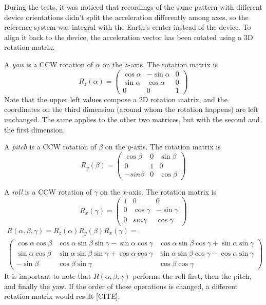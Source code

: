 During the tests, it was noticed that recordings of the same pattern with different device orientations didn't split the acceleration differently among axes, so the reference system was integral with the Earth's center instead of the device. To align it back to the device, the acceleration vector has been rotated using a 3D rotation matrix.
\bigbreak

A \textit{yaw} is a CCW rotation of $\alpha$ on the $z$-axis. The rotation matrix is
\[
	R_z(\alpha) =
	\begin{pmatrix}
		\cos\alpha & -\sin\alpha & 0 \\
		\sin\alpha & \cos\alpha & 0 \\
		0 & 0 & 1
	\end{pmatrix}
\]
Note that the upper left values compose a 2D rotation matrix, and the coordinates on the third dimension (around whom the rotation happens) are left unchanged. The same applies to the other two matrices, but with the second and the first dimension.
\bigbreak

A \textit{pitch} is a CCW rotation of $\beta$ on the $y$-axis. The rotation matrix is
\[
	R_y(\beta) =
	\begin{pmatrix}
		\cos\beta & 0 & \sin\beta \\
		0 & 1 & 0 \\
		-sin\beta & 0 & \cos\beta
	\end{pmatrix}
\]

A \textit{roll} is a CCW rotation of $\gamma$ on the $x$-axis. The rotation matrix is
\[
	R_x(\gamma) =
	\begin{pmatrix}
		1 & 0 & 0 \\
		0 & \cos\gamma & -\sin\gamma \\
		0 & sin\gamma & \cos\gamma
	\end{pmatrix}
\]
\begin{gather*}
	R(\alpha, \beta, \gamma) = R_z(\alpha) R_y(\beta) R_x(\gamma) = \\
	\begin{pmatrix}
		\cos\alpha \cos\beta & \cos\alpha \sin\beta \sin\gamma - \sin\alpha \cos\gamma & \cos\alpha \sin\beta \cos\gamma + \sin\alpha \sin\gamma \\
		\sin\alpha \cos\beta & \sin\alpha \sin\beta \sin\gamma + \cos\alpha \cos\gamma & \sin\alpha \sin\beta \cos\gamma - \cos\alpha \sin\gamma \\
		-\sin\beta & \cos\beta \sin\gamma & \cos\beta \cos\gamma
	\end{pmatrix}
\end{gather*}
It is important to note that $R(\alpha, \beta, \gamma)$ performs the roll first, then the pitch, and finally the yaw. If the order of these operations is changed, a different rotation matrix would result [CITE].
\bigbreak

